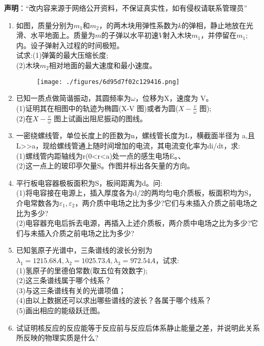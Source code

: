 
\textbf{声明}：“改内容来源于网络公开资料，不保证真实性，如有侵权请联系管理员”
\begin{enumerate}
\item 如图，质量分别为$m_1$和$m_2$，的两木块用弹性系数为$k$的弹相，静止地放在光滑、水平地面上。质量为$m$的子弹以水平初速$V$射入木块$m_1$，并停留在$m_1$;内。设子弹射入过程的时间极短。\\
试求:(1)弹簧的最大压缩长度;\\
(2)木块$m_2$相对地面的最大速度和最小速度。
\begin{figure}[ht]
\centering
\texttt{[image: ./figures/6d95d7f02c129416.png]}
\caption{} \label{fig_SSD02_1}
\end{figure}
\item  已知一质点做简谐振动，其圆频率为$\omega$，位移为X，速度为 V。\\
(1)证明其在相图中的轨迹为椭圆(X-V 图)或者为圆($\displaystyle X-\frac{v}{\omega}$ 图);\\
(2)在$\displaystyle X-\frac{v}{\omega}$ 图上试画出阻尼振动的图线。
\item 一密绕螺线管，单位长度上的匝数为n，螺线管长度为L，横截面半径为 a,且L>>a，现给螺线管通上随时间增加的电流，其电流变化率为di/dt，求:\\
(1)螺线管内距轴线为r(0<r<a)处一点的感生电场E。、\\
(2)这一点上的玻印亭欠量S。作图并标出各矢量的方向。
\item 平行板电容器极板面积为S，板间距离为d。问:\\
(1)将电容接在电源上，插入厚度各为d/2的两均匀电介质板，板面积均为S，介电常数各为$\varepsilon_1,\varepsilon_2$，两介质中电场之比为多少?它们与未插入介质之前电场之比为多少?\\
(2)电容器充电后拆去电源，再插入上述介质板，两介质中电场之比为多少?它们与未插入介质之前电场之比为多少?
\item 已知氢原子光谱中，三条谱线的波长分别为$\lambda_1=1215.68A,\lambda_2=1025.73A,\lambda_3=972.54A$，试求:\\
(1)氢原子的里德伯常数(取五位有效数字);\\
(2)这三条谱线属于哪个线系？\\
(3)与这三条谱线有关的光谱项值；\\
(4)由以上数据还可以求出哪些谱线的波长？各属于哪个线系？\\
(5)画出相应的能级跃迁图。
\item 试证明核反应的反应能等于反应前与反应后体系静止能量之差，并说明此关系所反映的物理实质是什么?
\end{enumerate}